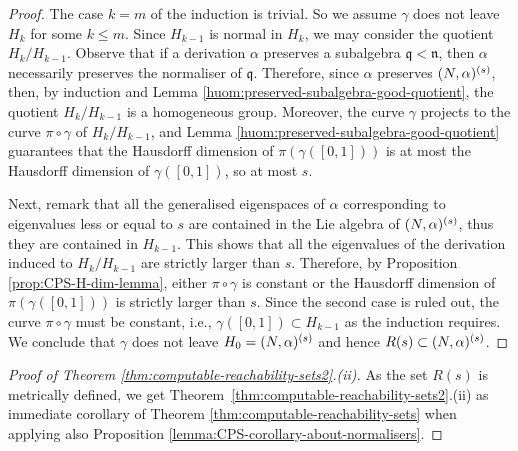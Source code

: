 \documentclass[a4paper,12pt]{amsart}
\theoremstyle{plain}
\theoremstyle{definition}
\theoremstyle{plain}
\theoremstyle{remark}
\begin{document}
\begin{proof}
	The case \( k=m \) of the induction is trivial. So we assume \( \gamma \) does not leave \( H_k \) for some \( k \le m \). Since \( H_{k-1} \) is normal in \( H_k \), we may consider the quotient \( H_k/H_{k-1} \).
	Observe that if a derivation \( \alpha \) preserves a subalgebra \( \mathfrak{q} < \mathfrak{n} \), then \( \alpha \) necessarily preserves the normaliser of \( \mathfrak{q} \).
	Therefore, since \( \alpha \) preserves \( (N,\alpha)^{(s)} \), then, by induction and Lemma \ref{huom:preserved-subalgebra-good-quotient}, the  quotient \( H_k/H_{k-1} \) is a homogeneous group. Moreover, the
	 curve \( \gamma \) projects to the curve \( \pi \circ \gamma \) of \( H_k/H_{k-1} \), and Lemma \ref{huom:preserved-subalgebra-good-quotient} guarantees that the Hausdorff dimension of \( \pi(\gamma([0,1])) \) is at most the Hausdorff dimension of \( \gamma([0,1]) \), so at most \( s \). 
	 
Next, remark that all the generalised eigenspaces of \( \alpha \) corresponding to eigenvalues less or equal to \( s \) are contained in the Lie algebra of \( (N,\alpha)^{(s)} \), thus they are contained in \( H_{k-1} \). This shows that all the eigenvalues of the derivation induced to \( H_k/H_{k-1} \) are strictly larger than \( s \). Therefore,
	 by Proposition \ref{prop:CPS-H-dim-lemma}, either \( \pi \circ \gamma \) is constant or the
	  Hausdorff dimension of \( \pi(\gamma([0,1])) \) is strictly larger than \(s\). Since the second case is ruled out, the curve \( \pi \circ \gamma \)  must be constant, i.e., \( \gamma([0,1]) \subset H_{k-1} \) as the induction requires. We conclude that \( \gamma \) does not leave \( H_0 =  (N,\alpha)^{(s)} \) and hence  \( R(s) \subset (N,\alpha)^{(s)} \). 
\end{proof}


\begin{proof}[Proof of Theorem \ref{thm:computable-reachability-sets2}.(ii)]
	As the set \( R(s) \) is metrically defined, we get Theorem~\ref{thm:computable-reachability-sets2}.(ii) as immediate corollary of Theorem \ref{thm:computable-reachability-sets} when applying also Proposition \ref{lemma:CPS-corollary-about-normalisers}.
\end{proof}
\end{document}
